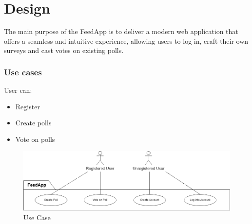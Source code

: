 \section{Design}
\label{sec:design}

The main purpose of the FeedApp is to deliver a modern web application that offers a seamless and intuitive experience, allowing users to log in, craft their own surveys and cast votes on existing polls.

\subsubsection*{Use cases}
User can: 
\begin{itemize}
\item Register
\item Create polls
\item Vote on polls
\end{itemize}

\begin{figure}[thb]
	\centering
	\includegraphics[scale=0.5]{figs/usecase.png}
	\caption{Use Case}
	\label{fig:usecase}
\end{figure}

